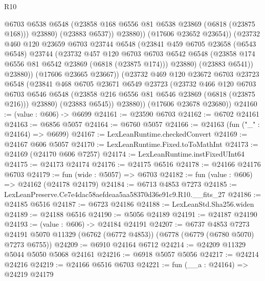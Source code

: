 \begin{lexlean}{R10}
\begin{coremodule}
                      @6703
                      @6538
                      @6548
                      (@23858 @168 @6556 @81 @6538 @23869 (@6818 (@23875 @168)))
                      @23880)
                    (@23883 @6537))
                  @23880))
              (@17606 @23652 @23654))
            (@23732
              @460
              @120
              @23659
              @6703
              @23744
              @6548
              (@23841
                @459
                @6705
                @23658
                (@6543 @6548)
                @23744
                (@23732
                  @457
                  @120
                  @6703
                  @6703
                  @6542
                  @6548
                  (@23858 @174 @6556 @81 @6542 @23869 (@6818 (@23875 @174)))
                  @23880)
                (@23883 @6541))
              @23880))
          (@17606 @23665 @23667))
        (@23732
          @469
          @120
          @23672
          @6703
          @23723
          @6548
          (@23841
            @468
            @6705
            @23671
            @6549
            @23723
            (@23732
              @466
              @120
              @6703
              @6703
              @6546
              @6548
              (@23858 @216 @6556 @81 @6546 @23869 (@6818 (@23875 @216)))
              @23880)
            (@23883 @6545))
          @23880))
      (@17606 @23678 @23680))
@24160 := (value : @606) -> @6699
@24161 := @23590 @6703
@24162 := @6702 @24161
@24163 := @6856 @5057
@24164 := @6760 @5057
@24166 := @24163 (fun ("_" : @24164) => @6699)
@24167 := LexLeanRuntime.checkedConvert
@24169 := @24167 @606 @5057
@24170 := LexLeanRuntime.Fixed.toToMathInt
@24173 := @24169 (@24170 @606 @7257)
@24174 := LexLeanRuntime.instFixedUInt64
@24175 := @24173 @24174
@24176 := @24175 @6516
@24178 := @24166 @24176 @6703
@24179 := fun (wide : @5057) => @6703
@24182 := fun (value : @606) => @24162 (@24178 @24179)
@24184 := @6713 @4853 @7273
@24185 := LexLeanPreserve.Ce7e4dac58aefdeaa5aa58370d36e91c9.R10.__fits_27
@24186 := @24185 @6516
@24187 := @6723 @24186
@24188 := LexLeanStd.Sha256.widen
@24189 := @24188 @6516
@24190 := @5056 @24189
@24191 := @24187 @24190
@24193 := (value : @606) -> @24184 @24191
@24207 := @6737
    @4853
    @7273
    @24191
    @5070
    @11329
    (@6762 (@6772 @4853))
    (@6778 (@6779 (@6780 @5070) @7273 @6755))
@24209 := @6910 @24164 @6712
@24214 := @24209 @11329 @5044 @5050 @5068 @24161
@24216 := @6918 @5057 @5056
@24217 := @24214 @24216
@24219 := @24166 @6516 @6703
@24221 := fun (__a : @24164) => @24219 @24179

\end{coremodule}
\end{lexlean}
